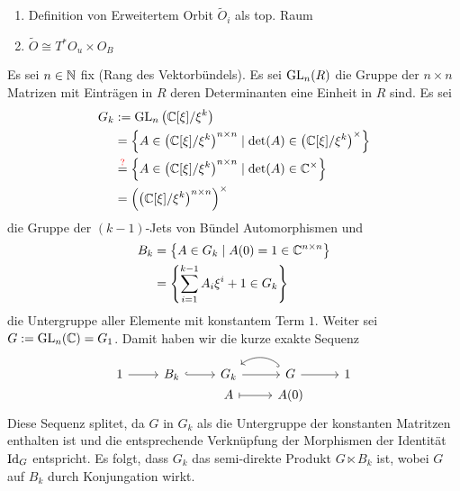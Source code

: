 \begin{ex}
\begin{enumerate}
\item
{} Definition von Erweitertem Orbit $\tilde O_i$ als top.
Raum
\item
{} $\tilde O\cong T^*O_u\times O_B$
\end{enumerate}
\end{ex}
Es sei $n\in\mathbb{N}$ fix (Rang des Vektorbündels).
Es sei $\operatorname{GL}_n(R)$ die Gruppe der $n\times n$ Matrizen mit Einträgen in $R$
deren Determinanten eine Einheit in $R$ sind.
Es sei
\begin{align*}
G_k&:=\operatorname{GL}_n\left(\mathbb{C}[\xi]/\xi^k\right)
\\&=\left\{A\in\left( \mathbb{C}[\xi]/\xi^k \right)^{n\times n}\mid
    \det(A)\in \left(\mathbb{C}[\xi]/\xi^k\right)^\times \right\}
\\&\overset{\text{\color{red}?}}=
    \left\{A\in\left( \mathbb{C}[\xi]/\xi^k \right)^{n\times n}\mid
    \det(A)\in \mathbb{C}^\times \right\}
\\&=\left(\left( \mathbb{C}[\xi]/\xi^k \right)^{n\times n}\right)^\times
\end{align*}
die Gruppe der $(k-1)$-Jets von Bündel Automorphismen und
\begin{align*}
B_k&=\left\{ A \in G_k \mid A(0)=1\in \mathbb{C}^{n\times n} \right\}
\\&=\left\{ \sum_{i=1}^{k-1}A_i\xi^i + 1 \in G_k \right\}
\end{align*}
die Untergruppe aller Elemente mit konstantem Term $1$.
Weiter sei $G:=\operatorname{GL}_n(\mathbb{C})=G_1$. Damit haben wir die kurze exakte Sequenz
\[ \begin{tikzcd}[row sep=0]
1 \rar & B_k \arrow[hook]{r} & G_k \rar & G \arrow[hook,bend right=40]{l}
  \rar & 1\\
& & A \arrow[|->]{r}& A(0)
\end{tikzcd} \]
Diese Sequenz splitet, da $G$ in $G_k$ als die Untergruppe der konstanten
Matritzen enthalten ist und die entsprechende Verknüpfung der Morphismen der
Identität $\operatorname{Id}_G$ entspricht.
Es folgt, dass $G_k$ das semi-direkte Produkt $G\ltimes B_k$
ist, wobei $G$ auf $B_k$ durch Konjungation wirkt.
\begin{comment}
Die Kategorie der Gruppen ist nicht Abelsch, deshalb folgt nur der Zerfall in
ein semidirektes Produkt.\\
Siehe \cite[p.148]{hatcher2002algebraic}
\end{comment}
\begin{comment}
Es gilt $B_k\vartriangleleft G_k$, $G_k=B_kG$ und $G\cap B_k=\{1\}$,
deshalb ist $G_k=B_k\rtimes G$ bzw. $G_k=G\ltimes B_k$, wie es hier geschrieben
wird.
\begin{cor}
Aus $G_k=G\ltimes B_k$ folgt, dass $G_k\slash B_k\cong G$.
\end{cor}
\begin{lem}
Falls $G_k=G\ltimes B_k$ und $G_k=G\rtimes B_k$ so folgt, dass $G_k=G\times
B_k$
\end{lem}
\end{comment}


